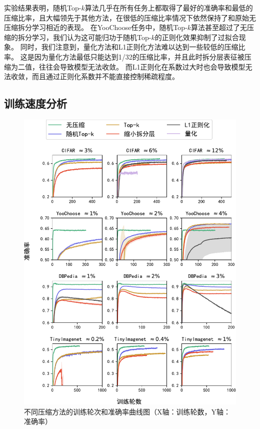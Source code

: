 实验结果表明，随机Top-$k$算法几乎在所有任务上都取得了最好的准确率和最低的压缩比率，且大幅领先于其他方法，在很低的压缩比率情况下依然保持了和原始无压缩拆分学习相近的表现。
%
在YooChoose任务中，随机Top-$k$算法甚至超过了无压缩的拆分学习，我们认为这可能归功于随机Top-$k$的正则化效果抑制了过拟合现象。
%
同时，我们注意到，量化方法和L1正则化方法难以达到一些较低的压缩比率。
这是因为量化方法最低只能达到1/32的压缩比率，并且此时拆分层表征被压缩为二值，往往会导致模型无法收敛。
而L1正则化在系数过大时也会导致模型无法收敛，而且通过正则化系数并不能直接控制稀疏程度。
%

\subsection{训练速度分析}
\begin{figure}[h!]
    \centering
    \includegraphics[width=1\linewidth]{Z_Resources/randtopk_acc-epoch}
    \caption{不同压缩方法的训练轮次和准确率曲线图（X轴：训练轮数，Y轴：准确率）}
    \label{fig:randomized_topk:training-epoch}
\end{figure}

